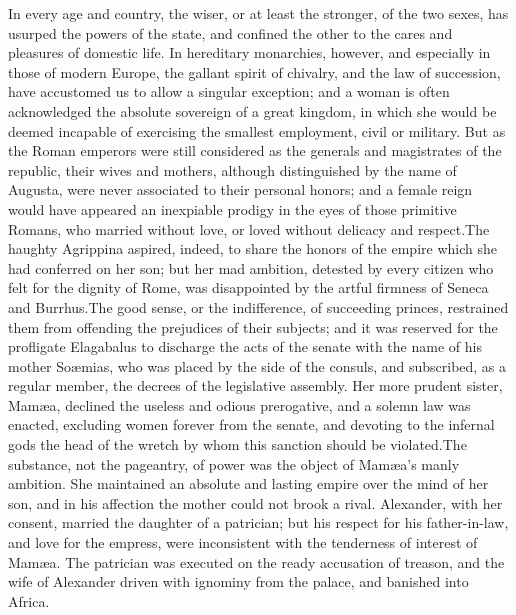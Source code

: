 In every age and country, the wiser, or at least the stronger, of
the two sexes, has usurped the powers of the state, and confined
the other to the cares and pleasures of domestic life. In
hereditary monarchies, however, and especially in those of modern
Europe, the gallant spirit of chivalry, and the law of
succession, have accustomed us to allow a singular exception; and
a woman is often acknowledged the absolute sovereign of a great
kingdom, in which she would be deemed incapable of exercising the
smallest employment, civil or military. But as the Roman emperors
were still considered as the generals and magistrates of the
republic, their wives and mothers, although distinguished by the
name of Augusta, were never associated to their personal honors;
and a female reign would have appeared an inexpiable prodigy in
the eyes of those primitive Romans, who married without love, or
loved without delicacy and respect.\footnotemark[64] The haughty Agrippina
aspired, indeed, to share the honors of the empire which she had
conferred on her son; but her mad ambition, detested by every
citizen who felt for the dignity of Rome, was disappointed by the
artful firmness of Seneca and Burrhus.\footnotemark[65] The good sense, or the
indifference, of succeeding princes, restrained them from
offending the prejudices of their subjects; and it was reserved
for the profligate Elagabalus to discharge the acts of the senate
with the name of his mother Soæmias, who was placed by the side
of the consuls, and subscribed, as a regular member, the decrees
of the legislative assembly. Her more prudent sister, Mamæa,
declined the useless and odious prerogative, and a solemn law was
enacted, excluding women forever from the senate, and devoting to
the infernal gods the head of the wretch by whom this sanction
should be violated.\footnotemark[66] The substance, not the pageantry, of power
was the object of Mamæa’s manly ambition. She maintained an
absolute and lasting empire over the mind of her son, and in his
affection the mother could not brook a rival. Alexander, with her
consent, married the daughter of a patrician; but his respect for
his father-in-law, and love for the empress, were inconsistent
with the tenderness of interest of Mamæa. The patrician was
executed on the ready accusation of treason, and the wife of
Alexander driven with ignominy from the palace, and banished into
Africa.\footnotemark[67]


